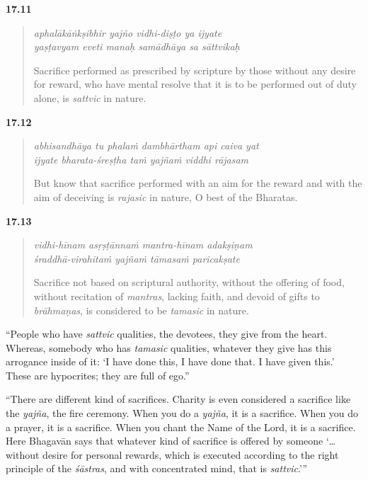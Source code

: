 \par\noindent\textbf{17.11}\par
\begin{verse}
\textit{aphalākāṅkṣibhir yajño vidhi-diṣṭo ya ijyate} \\
\textit{yaṣṭavyam eveti manaḥ samādhāya sa sāttvikaḥ}

\noindent Sacrifice performed as prescribed by scripture by those without any desire for reward, who have mental resolve that it is to be performed out of duty alone, is \textit{sattvic} in nature.
\end{verse}
\par




\par\noindent\textbf{17.12}\par
\begin{verse}
\textit{abhisandhāya tu phalaṁ dambhārtham api caiva yat} \\
\textit{ijyate bharata-śreṣṭha taṁ yajñaṁ viddhi rājasam}

\noindent But know that sacrifice performed with an aim for the reward and with the aim of deceiving is \textit{rajasic} in nature, O best of the Bharatas.
\end{verse}
\par



\par\noindent\textbf{17.13}\par
\begin{verse}
\textit{vidhi-hīnam asṛṣṭānnaṁ mantra-hīnam adakṣiṇam} \\
\textit{śraddhā-virahitaṁ yajñaṁ tāmasaṁ paricakṣate}

\noindent Sacrifice not based on scriptural authority, without the offering of food, without recitation of \textit{mantras}, lacking faith, and devoid of gifts to \textit{brāhmaṇas}, is considered to be \textit{tamasic} in nature.
\end{verse}
\par


\enquote{People who have \textit{sattvic} qualities, the devotees, they give from the heart. Whereas, somebody who has \textit{tamasic} qualities, whatever they give has this arrogance inside of it: \enquote{I have done this, I have done that. I have given this.} These are hypocrites; they are full of ego.}

\enquote{There are different kind of sacrifices. Charity is even considered a sacrifice like the \textit{yajña}, the fire ceremony. When you do a \textit{yajña}, it is a sacrifice. When you do a prayer, it is a sacrifice. When you chant the Name of the Lord, it is a sacrifice. Here Bhagavān says that whatever kind of sacrifice is offered by someone \enquote{\ldots without desire for personal rewards, which is executed according to the right principle of the \textit{śāstras}, and with concentrated mind, that is \textit{sattvic}.}}


